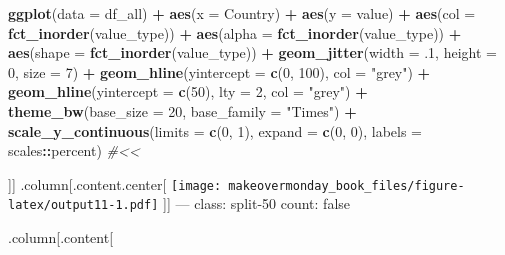 \documentclass[]{book}
\newenvironment{Shaded}{\begin{snugshade}}{\end{snugshade}}
\newcommand{\KeywordTok}[1]{\textcolor[rgb]{0.13,0.29,0.53}{\textbf{#1}}}
\newcommand{\DataTypeTok}[1]{\textcolor[rgb]{0.13,0.29,0.53}{#1}}
\newcommand{\DecValTok}[1]{\textcolor[rgb]{0.00,0.00,0.81}{#1}}
\newcommand{\StringTok}[1]{\textcolor[rgb]{0.31,0.60,0.02}{#1}}
\newcommand{\CommentTok}[1]{\textcolor[rgb]{0.56,0.35,0.01}{\textit{#1}}}
\newcommand{\OperatorTok}[1]{\textcolor[rgb]{0.81,0.36,0.00}{\textbf{#1}}}
\newcommand{\NormalTok}[1]{#1}
\theoremstyle{definition}
\theoremstyle{definition}
\theoremstyle{definition}
\theoremstyle{remark}
\begin{document}
\begin{Shaded}
\begin{Highlighting}[]
\KeywordTok{ggplot}\NormalTok{(}\DataTypeTok{data =}\NormalTok{ df_all) }\OperatorTok{+}
\StringTok{  }\KeywordTok{aes}\NormalTok{(}\DataTypeTok{x =}\NormalTok{ Country) }\OperatorTok{+}
\StringTok{  }\KeywordTok{aes}\NormalTok{(}\DataTypeTok{y =}\NormalTok{ value) }\OperatorTok{+}
\StringTok{  }\KeywordTok{aes}\NormalTok{(}\DataTypeTok{col =} \KeywordTok{fct_inorder}\NormalTok{(value_type)) }\OperatorTok{+}
\StringTok{  }\KeywordTok{aes}\NormalTok{(}\DataTypeTok{alpha =} \KeywordTok{fct_inorder}\NormalTok{(value_type)) }\OperatorTok{+}
\StringTok{  }\KeywordTok{aes}\NormalTok{(}\DataTypeTok{shape =} \KeywordTok{fct_inorder}\NormalTok{(value_type)) }\OperatorTok{+}
\StringTok{  }\KeywordTok{geom_jitter}\NormalTok{(}\DataTypeTok{width =}\NormalTok{ .}\DecValTok{1}\NormalTok{, }\DataTypeTok{height =} \DecValTok{0}\NormalTok{, }\DataTypeTok{size =} \DecValTok{7}\NormalTok{) }\OperatorTok{+}
\StringTok{  }\KeywordTok{geom_hline}\NormalTok{(}\DataTypeTok{yintercept =} \KeywordTok{c}\NormalTok{(}\DecValTok{0}\NormalTok{, }\DecValTok{100}\NormalTok{), }\DataTypeTok{col =} \StringTok{"grey"}\NormalTok{) }\OperatorTok{+}
\StringTok{  }\KeywordTok{geom_hline}\NormalTok{(}\DataTypeTok{yintercept =} \KeywordTok{c}\NormalTok{(}\DecValTok{50}\NormalTok{), }\DataTypeTok{lty =} \DecValTok{2}\NormalTok{, }\DataTypeTok{col =} \StringTok{"grey"}\NormalTok{) }\OperatorTok{+}
\StringTok{  }\KeywordTok{theme_bw}\NormalTok{(}\DataTypeTok{base_size =} \DecValTok{20}\NormalTok{, }\DataTypeTok{base_family =} \StringTok{"Times"}\NormalTok{) }\OperatorTok{+}
\StringTok{  }\KeywordTok{scale_y_continuous}\NormalTok{(}\DataTypeTok{limits =} \KeywordTok{c}\NormalTok{(}\DecValTok{0}\NormalTok{, }\DecValTok{1}\NormalTok{), }\DataTypeTok{expand =} \KeywordTok{c}\NormalTok{(}\DecValTok{0}\NormalTok{, }\DecValTok{0}\NormalTok{), }\DataTypeTok{labels =}\NormalTok{ scales}\OperatorTok{::}\NormalTok{percent)  }\CommentTok{#<<}
\end{Highlighting}
\end{Shaded}

{]}{]} .column{[}.content.center{[}
\texttt{[image: makeovermonday\_book\_files/figure-latex/output11-1.pdf]}
{]}{]} --- class: split-50 count: false

.column{[}.content{[}
\end{document}
